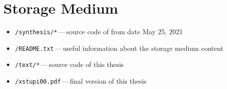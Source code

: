 \chapter{Storage Medium}
\begin{itemize}
   \item[] \texttt{/synthesis/*}\,---\,source code of \toolname{} from date May 25, 2021
   \item[] \texttt{/README.txt}\,---\,useful information about the storage medium content
   \item[] \texttt{/text/*}\,---\,source code of this thesis
   \item[] \texttt{/xstupi00.pdf}\,---\,final version of this thesis
\end{itemize}